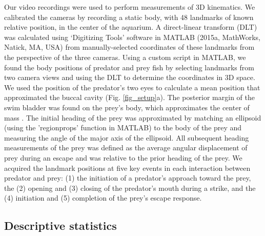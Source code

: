 \documentclass[]{rsos}%
\begin{document}
Our video recordings were used to perform measurements of 3D kinematics. 
We calibrated the cameras by recording a static body, with 48 landmarks of known relative position, in the center of the aquarium.
A direct-linear transform (DLT) was calculated using `Digitizing Tools' software in MATLAB (2015a, MathWorks, Natick, MA, USA) \cite{Hedrick:2008wz} from manually-selected coordinates of these landmarks from the perspective of the three cameras.
Using a custom script in MATLAB, we found the body positions of predator and prey fish by selecting landmarks from two camera views and using the DLT to determine the coordinates in 3D space.
We used the position of the predator's two eyes to calculate a mean position that approximated the buccal cavity (Fig. \ref{fig_setup}a).
The posterior margin of the swim bladder was found on the prey's body, which approximates the center of mass \cite{Stewart:2010ig}.
The initial heading of the prey was approximated by matching an ellipsoid (using the 'regionprops' function in MATLAB) to the body of the prey and measuring the angle of the major axis of the ellipsoid.
All subsequent heading measurements of the prey was defined as the average angular displacement of prey during an escape and was relative to the prior heading of the prey.
We acquired the landmark positions at five key events in each interaction between predator and prey: (1) the initiation of a predator's approach toward the prey, the (2) opening and (3) closing of the predator's mouth during a strike, and the (4) initiation and (5) completion of the prey's escape response.


\subsection{Descriptive statistics}
\end{document}
